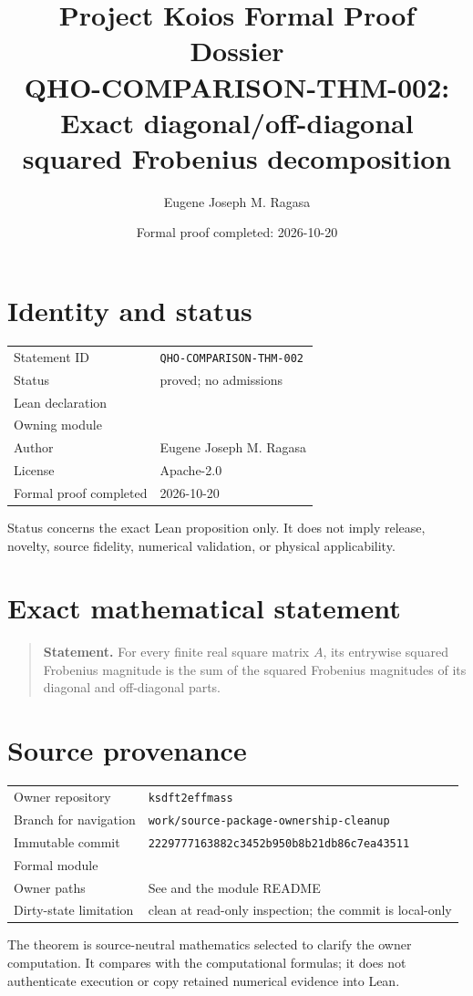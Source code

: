\documentclass[11pt]{article}
\title{Project Koios Formal Proof Dossier\\\large QHO-COMPARISON-THM-002: Exact diagonal/off-diagonal squared Frobenius decomposition}
\author{Eugene Joseph M. Ragasa}
\date{Formal proof completed: 2026-10-20}
\begin{document}
\maketitle

\section{Identity and status}
\begin{tabularx}{\textwidth}{@{}lY@{}}\toprule
Statement ID & \texttt{QHO-COMPARISON-THM-002} \\
Status & proved; no admissions \\
Lean declaration &  \\
Owning module &  \\
Author & Eugene Joseph M. Ragasa \\
License & Apache-2.0 \\
Formal proof completed & 2026-10-20 \\
\bottomrule\end{tabularx}
Status concerns the exact Lean proposition only. It does not imply release, novelty,
source fidelity, numerical validation, or physical applicability.

\section{Exact mathematical statement}
\begin{quote}\textbf{Statement.} For every finite real square matrix $A$, its entrywise squared Frobenius magnitude is the sum of the squared Frobenius magnitudes of its diagonal and off-diagonal parts.\end{quote}

\section{Source provenance}
\begin{tabularx}{\textwidth}{@{}lY@{}}\toprule
Owner repository & \texttt{ksdft2effmass} \\
Branch for navigation & \texttt{work/source-package-ownership-cleanup} \\
Immutable commit & \texttt{2229777163882c3452b950b8b21db86c7ea43511} \\
Formal module &  \\
Owner paths & See  and the module README \\
Dirty-state limitation & clean at read-only inspection; the commit is local-only \\
\bottomrule\end{tabularx}
The theorem is source-neutral mathematics selected to clarify the owner computation. It
compares with the computational formulas; it does not authenticate execution or copy
retained numerical evidence into Lean.
\end{document}
